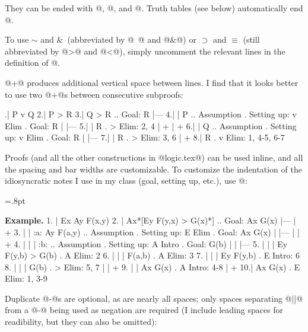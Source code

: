 \noindent They can be ended with @\endconnectives@, @\endquantifiers@, and @\resetasterisk@. Truth tables (see below) automatically end @\quantifiers@.

To use $\sim$ and \&\ (abbreviated by @~@ and @&@) or $\supset$ and $\equiv$ (still abbreviated by @>@ and @<@), simply uncomment the relevant lines in the definition of @\connectives@.





@+@ produces additional vertical space between lines. I find that it looks better to use two @+@s between consecutive subproofs:

.| P v Q
 2.| P > R
 3.| Q > R  ..  Goal: R
   |---
 4.|   | P  ..  Assumption  .  Setting up: v Elim  .  Goal: R
   |   |---
 5.|   | R  .  > Elim: 2, 4
   |   +
   |   +
 6.|   | Q  ..  Assumption  .  Setting up: v Elim  .  Goal: R
   |   |---
 7.|   | R  .  > Elim: 3, 6
   |   +
 8.| R      .  v Elim: 1, 4-5, 6-7
\endfitchproof

Proofs (and all the other constructions in @logic.tex@) can be used inline, and all the spacing and bar widths are customizable. To customize the indentation of the idiosyncratic notes I use in my class (goal, setting up, etc.), use @\fitchproofindentby@:

\fitchrowheight=10.5pt \fitchrowdepth=3.5pt%
\fitchbarrowheight=4pt \fitchbarrowdepth=4pt%
\fitchbarlength=12pt%
\fitchlinethickness=.8pt%
\fitchpaddingthickness=2pt%
\fitchspace=4pt%

{\bf Example. }
\fitchproofindentby{-12pt}
  1. | Ex Ay F(x,y)
  2. | Ax*[Ey F(y,x) > G(x)*]    ..    Goal: Ax G(x)
     |---
     |   +
  3. |   | :a: Ay F(a,y)         ..    Assumption . Setting up: E Elim   .  Goal: Ax G(x)
     |   |---
     |   |   +
  4. |   |   | :b:               ..    Assumption . Setting up: A Intro  .  Goal: G(b)
     |   |   |---
  5. |   |   | Ey F(y,b) > G(b)  .  A Elim: 2
  6. |   |   | F(a,b)            .  A Elim: 3
  7. |   |   | Ey F(y,b)         .  E Intro: 6
  8. |   |   | G(b)              .  > Elim: 5, 7
     |   |   +
  9. |   | Ax G(x)  .  A Intro: 4-8
     |   +
  10.| Ax G(x)      .  E Elim: 1, 3-9
\endfitchproof

Duplicate @-@s are optional, as are nearly all spaces; only spaces separating @||@ from a @-@ being used as negation are required (I include leading spaces for readibility, but they can also be omitted):

